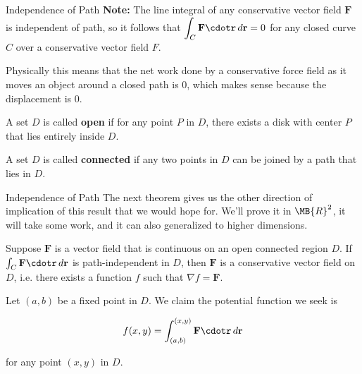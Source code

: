 \documentclass[11pt,english,
handout
]{beamer}
\begin{document}
\begin{frame}[t]{Independence of Path}
\small
\textbf{Note:} The line integral of any conservative vector field $\mathbf{F}$ is independent of path, so it follows that $\displaystyle \int_C\mathbf{F}\cdotr\,d\mathbf{r}=0$ for any closed curve $C$ over a conservative vector field $F$. \pause 

Physically this means that the net work done by a conservative force field as it moves an object around a closed path is 0, which makes sense because the displacement is 0.\pause

\lspace
\begin{definition}
A set $D$ is called \textbf{open} if for any point $P$ in $D$, there exists a disk with center $P$ that lies entirely inside $D$.
\end{definition}\pause

\lspace
\begin{definition}
A set $D$ is called \textbf{connected} if any two points in $D$ can be joined by a path that lies in $D$.
\end{definition}
\end{frame}












\begin{frame}[t]{Independence of Path}
\small
The next theorem gives us the other direction of implication of this result that we would hope for. We'll prove it in $\MB{R}^2$, it will take some work, and it can also  generalized to higher dimensions.\pause 

\lspace
\begin{theorem}
Suppose $\mathbf{F}$ is a vector field that is continuous on an open connected region $D$. If $\int_C\mathbf{F}\cdotr\,d\mathbf{r}$ is path-independent in $D$, then $\mathbf{F}$ is a conservative vector field on $D$, i.e. there exists a function $f$ such that $\nabla f=\mathbf{F}$.
\end{theorem}\pause 

\lspace
\begin{proofs}
Let $(a,b)$ be a fixed point in $D$. We claim the potential function we seek is

\[
f(x,y)=\int_{(a,b)}^{(x,y)}\mathbf{F}\cdotr\,d\mathbf{r}
\]

for any point $(x,y)$ in $D$. 
\end{proofs}
\end{frame}
\end{document}
